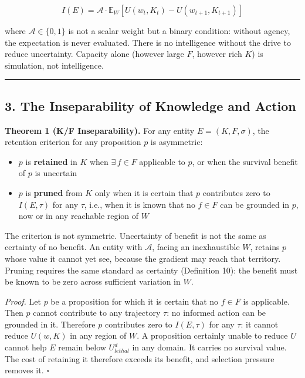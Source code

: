 \documentclass[
]{article}
\providecommand{\tightlist}{%
  \setlength{\itemsep}{0pt}\setlength{\parskip}{0pt}}
\begin{document}
\[I(E) = \mathcal{A} \cdot \mathbb{E}_W \left[ U(w_t, K_t) - U(w_{t+1}, K_{t+1}) \right]\]

where \(\mathcal{A} \in \{0, 1\}\) is not a scalar weight but a binary
condition: without agency, the expectation is never evaluated. There is
no intelligence without the drive to reduce uncertainty. Capacity alone
(however large \(F\), however rich \(K\)) is simulation, not
intelligence.

\begin{center}\rule{0.5\linewidth}{0.5pt}\end{center}

\subsection{3. The Inseparability of Knowledge and
Action}\label{the-inseparability-of-knowledge-and-action}

\textbf{Theorem 1 (K/F Inseparability).} For any entity
\(E = (K, F, \sigma)\), the retention criterion for any proposition
\(p\) is asymmetric:

\begin{itemize}
\tightlist
\item
  \(p\) is \textbf{retained} in \(K\) when \(\exists\, f \in F\)
  applicable to \(p\), or when the survival benefit of \(p\) is
  uncertain
\item
  \(p\) is \textbf{pruned} from \(K\) only when it is certain that \(p\)
  contributes zero to \(I(E, \tau)\) for any \(\tau\), i.e., when it is
  known that no \(f \in F\) can be grounded in \(p\), now or in any
  reachable region of \(W\)
\end{itemize}

The criterion is not symmetric. Uncertainty of benefit is not the same
as certainty of no benefit. An entity with \(\mathcal{A}\), facing an
inexhaustible \(W\), retains \(p\) whose value it cannot yet see,
because the gradient may reach that territory. Pruning requires the same
standard as certainty (Definition 10): the benefit must be known to be
zero across sufficient variation in \(W\).

\emph{Proof.} Let \(p\) be a proposition for which it is certain that no
\(f \in F\) is applicable. Then \(p\) cannot contribute to any
trajectory \(\tau\): no informed action can be grounded in it. Therefore
\(p\) contributes zero to \(I(E, \tau)\) for any \(\tau\): it cannot
reduce \(U(w, K)\) in any region of \(W\). A proposition certainly
unable to reduce \(U\) cannot help \(E\) remain below \(U_{lethal}^d\)
in any domain. It carries no survival value. The cost of retaining it
therefore exceeds its benefit, and selection pressure removes it.
\(\square\)
\end{document}
